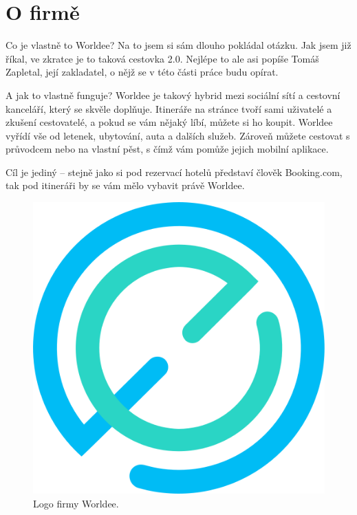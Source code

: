 \section{O firmě}

Co je vlastně to Worldee? Na to jsem si sám dlouho pokládal otázku. Jak jsem již říkal, ve zkratce je to taková cestovka 2.0. Nejlépe to ale asi popíše Tomáš Zapletal, její zakladatel, o nějž se v této části práce budu opírat.\cite{WorldeeInfo}

\begin{displayquote}
\end{displayquote}

A jak to vlastně funguje? Worldee je takový hybrid mezi sociální sítí a cestovní kanceláří, který se skvěle doplňuje. Itineráře na stránce tvoří sami uživatelé a zkušení cestovatelé, a pokud se vám nějaký líbí, můžete si ho koupit. Worldee vyřídí vše od letenek, ubytování, auta a dalších služeb. Zároveň můžete cestovat s průvodcem nebo na vlastní pěst, s čímž vám pomůže jejich mobilní aplikace.

Cíl je jediný – stejně jako si pod rezervací hotelů představí člověk Booking.com, tak pod itineráři by se vám mělo vybavit právě Worldee.
\\
\begin{figure}[!h]
    \centering
    \includegraphics[width=0.3\linewidth]{obrazky/worldee.png}
    \caption[Logo firmy Worldee]{Logo firmy Worldee.\cite{Worldee}}
\end{figure}